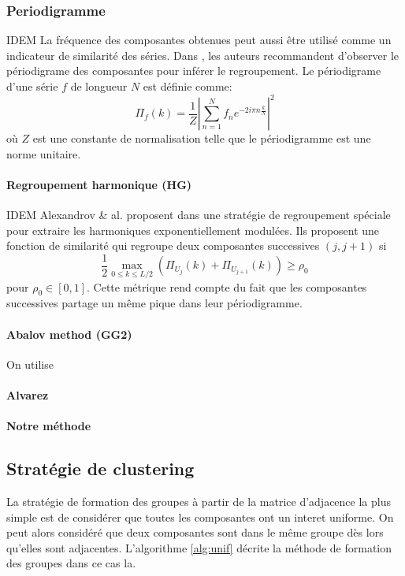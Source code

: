 \documentclass{gretsi}
\begin{document}
\subsubsection{Periodigramme}
IDEM
La fréquence des composantes obtenues peut aussi être utilisé comme un indicateur de similarité des séries. Dans \cite{GNZ_10_SSA}, les auteurs recommandent d'observer le périodigrame des composantes pour inférer le regroupement. Le périodigrame d'une série $f$ de longueur $N$ est définie comme:$$
\Pi_f(k) = \frac{1}{Z}\left|\sum_{n=1}^N f_n e^{-2i\pi n \frac{k}{N}}\right|^2
$$ où $Z$ est une constante de normalisation telle que le périodigramme est une norme unitaire.\\

\paragraph{Regroupement harmonique (HG)}\label{par:alex} IDEM Alexandrov \& al. proposent dans \cite{alexandrov_05_auto} une stratégie de regroupement spéciale pour extraire les harmoniques exponentiellement modulées. Ils proposent une fonction de similarité qui regroupe deux composantes successives $(j, j+1)$ si$$
\frac{1}{2}\max_{0\le k \le L/2}\left(\Pi_{U_j}(k) + \Pi_{U_{j+1}}(k)\right) \ge \rho_0
$$ pour $\rho_0\in \left[0, 1\right]$. Cette métrique rend compte du fait que les composantes successives partage un même pique dans leur périodigramme.


\paragraph{Abalov method (GG2)}
\label{par:abalov}
\cite{abalov_14_auto}
On utilise
\paragraph{Alvarez}
\label{par:alva}
\cite{alvarez_2013_auto}
\paragraph{Notre méthode}
\label{par:tomtom}

\subsection{Stratégie de clustering}
\label{sub:clust}

La stratégie de formation des groupes à partir de la matrice d'adjacence la plus simple est de considérer que toutes les composantes ont un interet uniforme. On peut alors considéré que deux composantes sont dans le même groupe dès lors qu'elles sont adjacentes. L'algorithme \ref{alg:unif} décrite la méthode de formation des groupes dans ce cas la.\\
\end{document}
